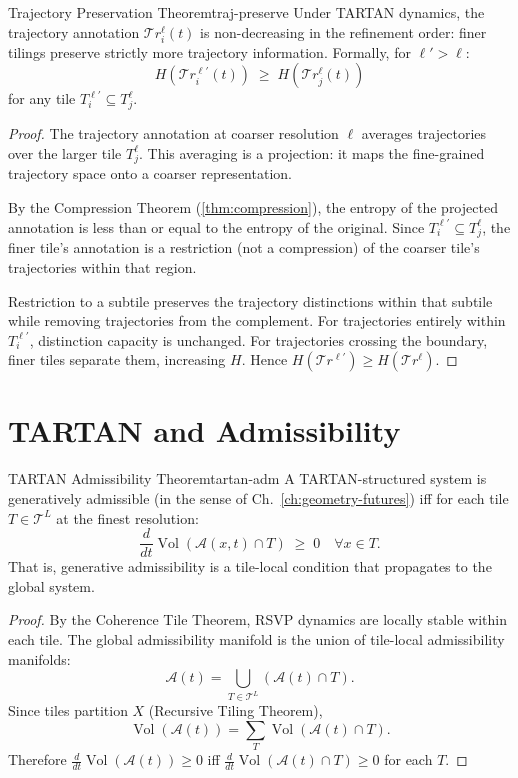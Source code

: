 \documentclass[12pt,twoside,openright]{book}
\newcommand{\adm}{\mathcal{A}}
\newcommand{\Vol}{\operatorname{Vol}}
\begin{document}
\begin{theorem}{Trajectory Preservation Theorem}{traj-preserve}
  Under TARTAN dynamics, the trajectory annotation
  $\mathcal{T}\!r^\ell_i(t)$ is non-decreasing in
  the refinement order: finer tilings preserve
  strictly more trajectory information.
  Formally, for $\ell' > \ell$:
  \[
    H(\mathcal{T}\!r^{\ell'}_i(t))
    \;\ge\;
    H(\mathcal{T}\!r^{\ell}_j(t))
  \]
  for any tile $T^{\ell'}_i \subseteq T^\ell_j$.
\end{theorem}

\begin{proof}
  The trajectory annotation at coarser resolution
  $\ell$ averages trajectories over the larger tile
  $T^\ell_j$. This averaging is a projection:
  it maps the fine-grained trajectory space onto a
  coarser representation.

  By the Compression Theorem (\cref{thm:compression}),
  the entropy of the projected annotation is less than
  or equal to the entropy of the original.
  Since $T^{\ell'}_i \subseteq T^\ell_j$, the finer
  tile's annotation is a restriction (not a compression)
  of the coarser tile's trajectories within that region.

  Restriction to a subtile preserves the trajectory
  distinctions within that subtile while removing
  trajectories from the complement. For trajectories
  entirely within $T^{\ell'}_i$, distinction capacity
  is unchanged. For trajectories crossing the boundary,
  finer tiles separate them, increasing $H$.
  Hence $H(\mathcal{T}\!r^{\ell'}) \ge H(\mathcal{T}\!r^\ell)$.
\end{proof}

\section{TARTAN and Admissibility}

\begin{theorem}{TARTAN Admissibility Theorem}{tartan-adm}
  A TARTAN-structured system is generatively admissible
  (in the sense of Ch.~\ref{ch:geometry-futures}) iff
  for each tile $T \in \mathcal{T}^L$ at the finest
  resolution:
  \[
    \frac{d}{dt}\Vol(\adm(x, t) \cap T)
    \;\ge\; 0
    \quad \forall x \in T.
  \]
  That is, generative admissibility is a tile-local
  condition that propagates to the global system.
\end{theorem}

\begin{proof}
  By the Coherence Tile Theorem, RSVP dynamics are
  locally stable within each tile. The global
  admissibility manifold is the union of tile-local
  admissibility manifolds:
  \[
    \adm(t) = \bigcup_{T \in \mathcal{T}^L}
    (\adm(t) \cap T).
  \]
  Since tiles partition $X$ (Recursive Tiling Theorem),
  \[
    \Vol(\adm(t))
    = \sum_{T} \Vol(\adm(t) \cap T).
  \]
  Therefore $\frac{d}{dt}\Vol(\adm(t)) \ge 0$ iff
  $\frac{d}{dt}\Vol(\adm(t) \cap T) \ge 0$ for each $T$.
\end{proof}
\end{document}
